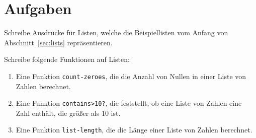 \section*{Aufgaben}

\begin{aufgabe}
  Schreibe Ausdrücke für Listen, welche die Beispiellisten vom
  Anfang von Abschnitt~\ref{sec:lists} repräsentieren.
\end{aufgabe}

\begin{aufgabe}
Schreibe folgende Funktionen auf Listen:
  
  \begin{enumerate} 
    
  \item Eine Funktion \texttt{count-zeroes}, die die Anzahl von Nullen
    in einer Liste von Zahlen berechnet.
    
  \item Eine Funktion \texttt{contains>10?}, die feststellt, ob eine
    Liste von Zahlen eine Zahl enthält, die größer als 10 ist.
    
  \item Eine Funktion \texttt{list-length}, die die Länge einer Liste
    von Zahlen berechnet.

  \end{enumerate}
  
\end{aufgabe}

